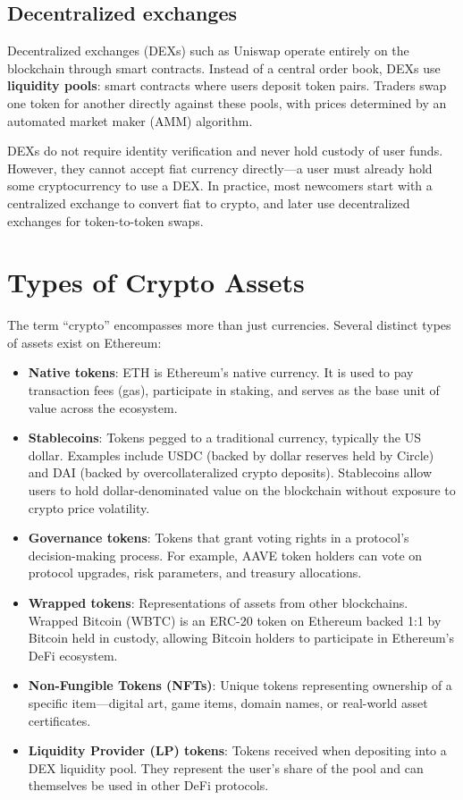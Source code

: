 \subsection{Decentralized exchanges}

Decentralized exchanges (DEXs) such as Uniswap operate entirely on the blockchain through smart contracts. Instead of a central order book, DEXs use \textbf{liquidity pools}: smart contracts where users deposit token pairs. Traders swap one token for another directly against these pools, with prices determined by an automated market maker (AMM) algorithm.

DEXs do not require identity verification and never hold custody of user funds. However, they cannot accept fiat currency directly---a user must already hold some cryptocurrency to use a DEX. In practice, most newcomers start with a centralized exchange to convert fiat to crypto, and later use decentralized exchanges for token-to-token swaps.

\section{Types of Crypto Assets}

The term ``crypto'' encompasses more than just currencies. Several distinct types of assets exist on Ethereum:

\begin{itemize}
    \item \textbf{Native tokens}: ETH is Ethereum's native currency. It is used to pay transaction fees (gas), participate in staking, and serves as the base unit of value across the ecosystem.

    \item \textbf{Stablecoins}: Tokens pegged to a traditional currency, typically the US dollar. Examples include USDC (backed by dollar reserves held by Circle) and DAI (backed by overcollateralized crypto deposits). Stablecoins allow users to hold dollar-denominated value on the blockchain without exposure to crypto price volatility.

    \item \textbf{Governance tokens}: Tokens that grant voting rights in a protocol's decision-making process. For example, AAVE token holders can vote on protocol upgrades, risk parameters, and treasury allocations.

    \item \textbf{Wrapped tokens}: Representations of assets from other blockchains. Wrapped Bitcoin (WBTC) is an ERC-20 token on Ethereum backed 1:1 by Bitcoin held in custody, allowing Bitcoin holders to participate in Ethereum's DeFi ecosystem.

    \item \textbf{Non-Fungible Tokens (NFTs)}: Unique tokens representing ownership of a specific item---digital art, game items, domain names, or real-world asset certificates.

    \item \textbf{Liquidity Provider (LP) tokens}: Tokens received when depositing into a DEX liquidity pool. They represent the user's share of the pool and can themselves be used in other DeFi protocols.
\end{itemize}

